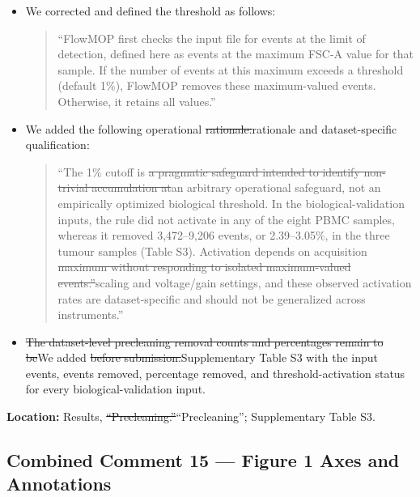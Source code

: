\documentclass[
  11pt,
  a4paper,
]{article}
\begin{document}
\begin{itemize}
\item
  We corrected and defined the threshold as follows:

  \begin{quote}
  ``FlowMOP first checks the input file for events at the limit of
  detection, defined here as events at the maximum FSC-A value for that
  sample. If the number of events at this maximum exceeds a threshold
  (default 1\%), FlowMOP removes these maximum-valued events. Otherwise,
  it retains all values.''
  \end{quote}
\item
  We added the following operational
  {\color{revisionred}\sout{rationale:}}{\color{revisionblue}rationale
  and dataset-specific qualification:}

  \begin{quote}
  ``The 1\% cutoff is {\color{revisionred}\sout{a pragmatic safeguard
  intended to identify non-trivial accumulation
  at}}{\color{revisionblue}an arbitrary operational safeguard, not an
  empirically optimized biological threshold. In} the
  {\color{revisionblue}biological-validation inputs, the rule did not
  activate in any of the eight PBMC samples, whereas it removed
  3,472--9,206 events, or 2.39--3.05\%, in the three tumour samples
  (Table S3). Activation depends on} acquisition
  {\color{revisionred}\sout{maximum without responding to isolated
  maximum-valued events.''}}{\color{revisionblue}scaling and
  voltage/gain settings, and these observed activation rates are
  dataset-specific and should not be generalized across instruments.''}
  \end{quote}
\item
  {\color{revisionred}\sout{The dataset-level precleaning removal counts
  and percentages remain to be}}{\color{revisionblue}We} added
  {\color{revisionred}\sout{before
  submission.}}{\color{revisionblue}Supplementary Table S3 with the
  input events, events removed, percentage removed, and
  threshold-activation status for every biological-validation input.}
\end{itemize}

\textbf{Location:} Results,
{\color{revisionred}\sout{``Precleaning.''}}{\color{revisionblue}``Precleaning'';
Supplementary Table S3.}

\subsection{Combined Comment 15 --- Figure 1 Axes and
Annotations}\label{combined-comment-15--figure-1-axes-and-annotations}
\end{document}
